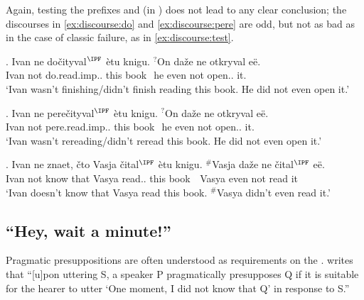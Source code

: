 Again, testing the prefixes  and  (in ) does not lead to any clear conclusion; the discourses in \ref{ex:discourse:do} and \ref{ex:discourse:pere} are odd, but not as bad as in the case of classic  failure, as in \ref{ex:discourse:test}.

\exg. \label{ex:discourse:do}Ivan ne do\v{c}ityval$^{\IPF}$ \`{e}tu knigu. $^?$On da\v{z}e ne otkryval e\"{e}.\\
Ivan not do.read.imp.. this book \textcolor{white}{$^?$}he even not open.. it.\\
\trans `Ivan wasn't finishing/didn't finish reading this book. He did not even open it.'

\exg. \label{ex:discourse:pere}Ivan ne pere\v{c}ityval$^{\IPF}$ \`{e}tu knigu. $^?$On da\v{z}e ne otkryval e\"{e}.\\
Ivan not pere.read.imp.. this book \textcolor{white}{$^?$}he even not open.. it.\\
\trans `Ivan wasn't rereading/didn't reread this book. He did not even open it.'

\exg. \label{ex:discourse:test}Ivan ne znaet, \v{c}to Vasja \v{c}ital$^{\IPF}$ \`{e}tu knigu. $^\#$Vasja da\v{z}e ne \v{c}ital$^{\IPF}$ e\"{e}.\\
Ivan not know that Vasya read.. this book \textcolor{white}{$^\#$}Vasya even not read it\\
\trans `Ivan doesn't know that Vasya read this book. $^\#$Vasya didn't even read it.'


\subsection{``Hey, wait a minute!''}
Pragmatic presuppositions are often understood as requirements on the  \citep[see e.g.,][]{Karttunen:73, Stalnaker:73, Shanon:76, Heim:83}. \citet[][248]{Shanon:76} writes that ``[u]pon uttering S, a speaker P pragmatically presupposes Q if it is suitable for the hearer to utter `One moment, I did not know that Q' in response to S.''\largerpage

